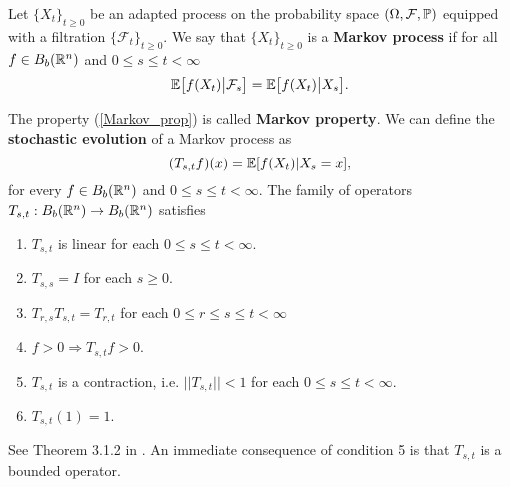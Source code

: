 \begin{Definition}
 Let $\{X_t\}_{t \ge 0}$  be an adapted process on the probability space $(\Omega,\mathcal{F},\mathbb{P})$ equipped with a filtration $\{ \mathcal{F}_t\}_{t\geq0}$.
 We say that $\{X_t\}_{t \ge 0}$ is a \textbf{Markov process} if for all $f\in B_b(\mathbb{R}^n)$
 and $0\leq s \leq t < \infty$
 \begin{equation} \label{Markov_prop}
  \mathbb{E} \bigl[ f(X_t) \big| \mathcal{F}_s \bigr] = \mathbb{E} \bigl[ f(X_t) \big| X_s \bigr].
 \end{equation}
\end{Definition}
The property (\ref{Markov_prop}) is called \textbf{Markov property}.
We can define the \textbf{stochastic evolution} of a Markov process as 
\begin{equation}\label{stoch_evolution}
 (T_{s,t}f)(x) = \mathbb{E}[f(X_t) |X_s = x],
\end{equation}
for every $f \in B_b(\mathbb{R}^n)$ and $0\leq s \leq t < \infty$.
The family of operators $T_{s,t} : B_b(\mathbb{R}^n) \to B_b(\mathbb{R}^n)$ satisfies  
\begin{enumerate}
 \item $T_{s,t}$ is linear for each $0\leq s \leq t < \infty$.
 \item $ T_{s,s} = I $ for each $s \geq 0$.
 \item $T_{r,s} T_{s,t} = T_{r,t}$ for each $0\leq r \leq s \leq t < \infty$
 \item $f>0 \Rightarrow T_{s,t}f >0$.
 \item $T_{s,t}$ is a contraction, i.e. $||T_{s,t}||<1$ for each $0\leq s \leq t < \infty$.
 \item $T_{s,t} (1) = 1$.
\end{enumerate}
See Theorem 3.1.2 in \cite{Applebaum}. An immediate consequence of condition 5 is that $T_{s,t}$ is a bounded operator.

